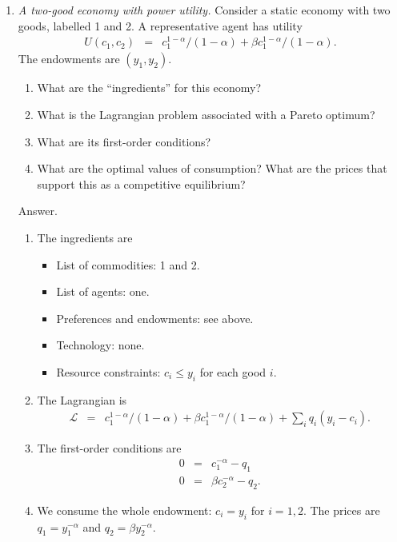 \documentclass[11pt]{article}
\begin{document}
\begin{enumerate}
\item {\it A two-good economy with power utility.\/}
Consider a static economy with two goods,
labelled 1 and 2.
A representative agent has utility
\begin{eqnarray*}
    U(c_1,c_2) &=& c_1^{1-\alpha}/(1-\alpha) + \beta c_1^{1-\alpha}/(1-\alpha).
\end{eqnarray*}
The endowments are $(y_1, y_2)$.
\begin{enumerate}
\item What are the ``ingredients'' for this economy?
\item What is the Lagrangian problem associated with a Pareto optimum?
\item What are its first-order conditions?
\item What are the optimal values of consumption?
What are the prices that support this as a competitive equilibrium?
\end{enumerate}
%
Answer.
\begin{enumerate}
\item The ingredients are
\begin{itemize}
\item List of commodities:  1 and 2.
\item List of agents:  one.
\item Preferences and endowments:  see above.
\item Technology:  none.
\item Resource constraints:  $c_i \leq y_i$ for each good $i$.
\end{itemize}
\item The Lagrangian is
\begin{eqnarray*}
    \mathcal{L} &=& c_1^{1-\alpha}/(1-\alpha) + \beta c_1^{1-\alpha}/(1-\alpha)
            + \sum_i q_i (y_i - c_i) .
\end{eqnarray*}
\item The first-order conditions are
\begin{eqnarray*}
    0 &=& c_1^{-\alpha} - q_1  \\
    0 &=& \beta c_2^{-\alpha} - q_2 .
\end{eqnarray*}
\item We consume the whole endowment: $c_i = y_i$ for $i=1,2$.
The prices are $ q_1 = y_1^{-\alpha}$ and $q_2 = \beta y_2^{-\alpha}$.
\end{enumerate}



\end{enumerate}
\end{document}
